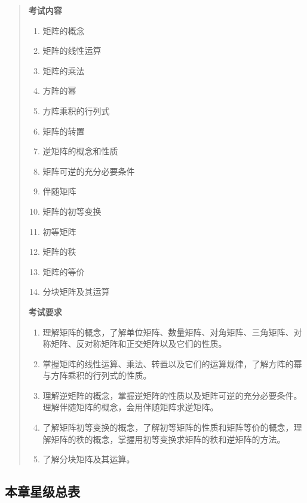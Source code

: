 \documentclass[11pt,openany,UTF8]{ctexbook}
\begin{document}
\begin{quote}
\textbf{考试内容}

\begin{enumerate}
\item 矩阵的概念
\item 矩阵的线性运算
\item 矩阵的乘法
\item 方阵的幂
\item 方阵乘积的行列式
\item 矩阵的转置
\item 逆矩阵的概念和性质
\item 矩阵可逆的充分必要条件
\item 伴随矩阵
\item 矩阵的初等变换
\item 初等矩阵
\item 矩阵的秩
\item 矩阵的等价
\item 分块矩阵及其运算
\end{enumerate}
\textbf{考试要求}

\begin{enumerate}
\item 理解矩阵的概念，了解单位矩阵、数量矩阵、对角矩阵、三角矩阵、对称矩阵、反对称矩阵和正交矩阵以及它们的性质。
\item 掌握矩阵的线性运算、乘法、转置以及它们的运算规律，了解方阵的幂与方阵乘积的行列式的性质。
\item 理解逆矩阵的概念，掌握逆矩阵的性质以及矩阵可逆的充分必要条件。理解伴随矩阵的概念，会用伴随矩阵求逆矩阵。
\item 了解矩阵初等变换的概念，了解初等矩阵的性质和矩阵等价的概念，理解矩阵的秩的概念，掌握用初等变换求矩阵的秩和逆矩阵的方法。
\item 了解分块矩阵及其运算。
\end{enumerate}
\end{quote}
\subsection*{本章星级总表}
\end{document}
